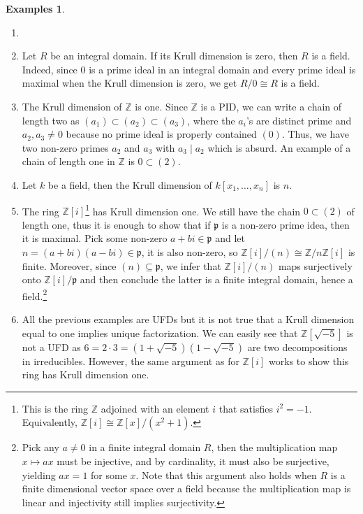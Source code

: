 \documentclass{tufte-handout} %
\theoremstyle{definition}
\newtheorem{exmps}[thm]{Examples}
\theoremstyle{remark}
\newcommand{\Z}{\mathbb{Z}}
\newcommand{\lp}{{\mathfrak{p}}}
\begin{document}
\begin{exmps}\label{exmpkrulldim}
	\begin{enumerate}
		\item[]
		\item Let $R$ be an integral domain. If its Krull dimension is zero, then $R$ is a field. Indeed, since $0$ is a prime ideal in an integral domain and every prime ideal is maximal when the Krull dimension is zero, we get $R/0 \cong R$ is a field.
		\item The Krull dimension of $\Z$ is one. Since $\Z$ is a PID, we can write a chain of length two as $(a_1) \subset (a_2) \subset (a_3)$, where the $a_i$'s are distinct prime and $a_2, a_3 \neq 0$ because no prime ideal is properly contained $(0)$. Thus, we have two non-zero primes $a_2$ and $a_3$ with $a_3 \mid a_2$ which is absurd. An example of a chain of length one in $\Z$ is $0 \subset (2)$.
		\item Let $k$ be a field, then the Krull dimension of $k[x_1, \dots, x_n]$ is $n$.
		\item The ring $\Z[i]$\footnote{This is the ring $\Z$ adjoined with an element $i$ that satisfies $i^2 = -1$. Equivalently, $\Z[i] \cong \Z[x]/(x^2+1)$.} has Krull dimension one. We still have the chain $0 \subset (2)$ of length one, thus it is enough to show that if $\lp$ is a non-zero prime idea, then it is maximal. Pick some non-zero $a+bi \in \lp$ and let $n = (a+bi)(a-bi) \in \lp$, it is also non-zero, so $\Z[i]/(n) \cong \Z/n\Z[i]$ is finite. Moreover, since $(n) \subseteq \lp$, we infer that $\Z[i]/(n)$ maps surjectively onto $\Z[i]/\lp$ and then conclude the latter is a finite integral domain, hence a field.\footnote{Pick any $a \neq 0$ in a finite integral domain $R$, then the multiplication map $x \mapsto ax$ must be injective, and by cardinality, it must also be surjective, yielding $ax = 1$ for some $x$. Note that this argument also holds when $R$ is a finite dimensional vector space over a field because the multiplication map is linear and injectivity still implies surjectivity.}
		\item All the previous examples are UFDs but it is not true that a Krull dimension equal to one implies unique factorization. We can easily see that $\Z[\sqrt{-5}]$ is not a UFD as $6 = 2\cdot 3 = (1+\sqrt{-5})(1-\sqrt{-5})$ are two decompositions in irreducibles. However, the same argument as for $\Z[i]$ works to show this ring has Krull dimension one.
	\end{enumerate}
\end{exmps}
\end{document}
